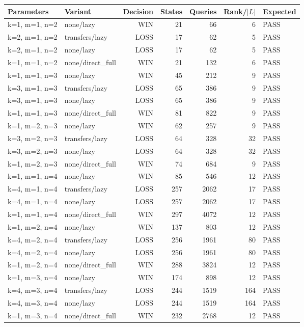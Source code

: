 \begin{longtable}{llrrrrl}
\toprule
Parameters & Variant & Decision & States & Queries & Rank/$|L|$ & Expected \\
\midrule
\endhead
k=1, m=1, n=2 & none/lazy & WIN & 21 & 66 & 6 & PASS \\
k=2, m=1, n=2 & transfers/lazy & LOSS & 17 & 62 & 5 & PASS \\
k=2, m=1, n=2 & none/lazy & LOSS & 17 & 62 & 5 & PASS \\
k=1, m=1, n=2 & none/direct\_full & WIN & 21 & 132 & 6 & PASS \\
k=1, m=1, n=3 & none/lazy & WIN & 45 & 212 & 9 & PASS \\
k=3, m=1, n=3 & transfers/lazy & LOSS & 65 & 386 & 9 & PASS \\
k=3, m=1, n=3 & none/lazy & LOSS & 65 & 386 & 9 & PASS \\
k=1, m=1, n=3 & none/direct\_full & WIN & 81 & 822 & 9 & PASS \\
k=1, m=2, n=3 & none/lazy & WIN & 62 & 257 & 9 & PASS \\
k=3, m=2, n=3 & transfers/lazy & LOSS & 64 & 328 & 32 & PASS \\
k=3, m=2, n=3 & none/lazy & LOSS & 64 & 328 & 32 & PASS \\
k=1, m=2, n=3 & none/direct\_full & WIN & 74 & 684 & 9 & PASS \\
k=1, m=1, n=4 & none/lazy & WIN & 85 & 546 & 12 & PASS \\
k=4, m=1, n=4 & transfers/lazy & LOSS & 257 & 2062 & 17 & PASS \\
k=4, m=1, n=4 & none/lazy & LOSS & 257 & 2062 & 17 & PASS \\
k=1, m=1, n=4 & none/direct\_full & WIN & 297 & 4072 & 12 & PASS \\
k=1, m=2, n=4 & none/lazy & WIN & 137 & 803 & 12 & PASS \\
k=4, m=2, n=4 & transfers/lazy & LOSS & 256 & 1961 & 80 & PASS \\
k=4, m=2, n=4 & none/lazy & LOSS & 256 & 1961 & 80 & PASS \\
k=1, m=2, n=4 & none/direct\_full & WIN & 288 & 3824 & 12 & PASS \\
k=1, m=3, n=4 & none/lazy & WIN & 174 & 898 & 12 & PASS \\
k=4, m=3, n=4 & transfers/lazy & LOSS & 244 & 1519 & 164 & PASS \\
k=4, m=3, n=4 & none/lazy & LOSS & 244 & 1519 & 164 & PASS \\
k=1, m=3, n=4 & none/direct\_full & WIN & 232 & 2768 & 12 & PASS \\

\end{longtable}
